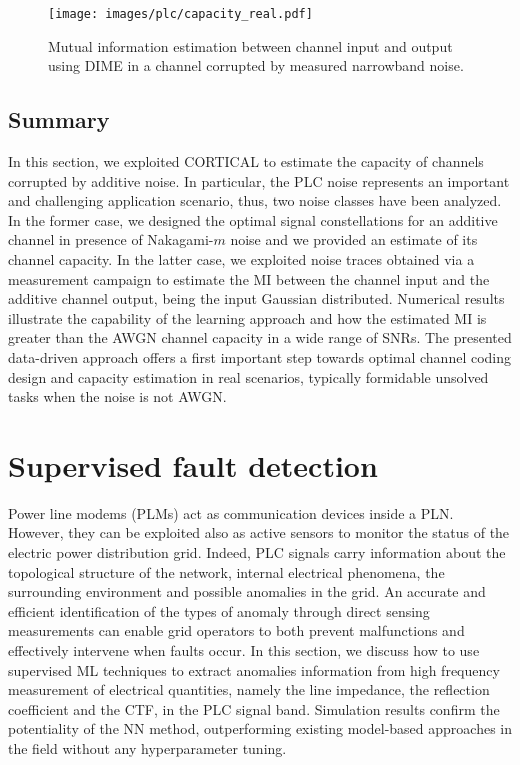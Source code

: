 \begin{figure}
	\centering
	\texttt{[image: images/plc/capacity\_real.pdf]}
	\caption{Mutual information estimation between channel input and output using DIME in a channel corrupted by measured narrowband noise.}
	\label{fig:plc_capacity_real}
\end{figure}

\subsection{Summary}
\label{subsec:isplc_conclusions}
In this section, we exploited CORTICAL to estimate the capacity of channels corrupted by additive noise. In particular, the PLC noise represents an important and challenging application scenario, thus, two noise classes have been analyzed. In the former case, we designed the optimal signal constellations for an additive channel in presence of Nakagami-$m$ noise and we provided an estimate of its channel capacity. In the latter case, we exploited noise traces obtained via a measurement campaign to estimate the MI between the channel input and the additive channel output, being the input Gaussian distributed. Numerical results illustrate the capability of the learning approach and how the estimated MI is greater than the AWGN channel capacity in a wide range of SNRs. The presented data-driven approach offers a first important step towards optimal channel coding design and capacity estimation in real scenarios, typically formidable unsolved tasks when the noise is not AWGN.

\section{Supervised fault detection}
\label{sec:plc_detection}
Power line modems (PLMs) act as communication devices inside a PLN. However, they can be exploited also as active sensors to monitor the status of the electric power distribution grid. Indeed, PLC signals carry information about the topological structure of the network, internal electrical phenomena, the surrounding environment and possible anomalies in the grid. An accurate and efficient identification of the types of anomaly through direct sensing measurements can enable grid operators to both prevent malfunctions and effectively intervene when faults occur. In this section, we discuss how to use supervised ML techniques to extract anomalies information from high frequency measurement of electrical quantities, namely the line impedance, the reflection coefficient and the CTF, in the PLC signal band. Simulation results confirm the potentiality of the NN method, outperforming existing model-based approaches in the field without any hyperparameter tuning. 

